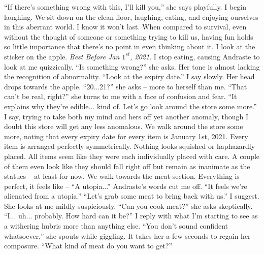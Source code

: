 \documentclass[a4paper, 12pt]{book}
\newcommand\tab[1][1cm]{\hspace*{#1}}
\begin{document}
\newline
\tab
``If there’s something wrong with this, I’ll kill you,'' she says playfully. I begin laughing. We sit down on the clean floor, laughing, eating, and enjoying ourselves in this aberrant world. I know it won’t last. When compared to survival, even without the thought of someone or something trying to kill us, having fun holds so little importance that there’s no point in even thinking about it.
\newline
\tab
I look at the sticker on the apple. \textit{Best Before Jan $1^{st}$, 2021}. I stop eating, causing Andraste to look at me quizzically. ``Is something wrong?'' she asks. Her tone is almost lacking the recognition of abnormality.
\newline
\tab
``Look at the expiry date.'' I say slowly.
\newline
\tab
Her head drops towards the apple. ``20...21?'' she asks -- more to herself than me. ``That can’t be real, right?'' she turns to me with a face of confusion and fear.
\newline
\tab
``It explains why they’re edible... kind of. Let’s go look around the store some more.'' I say, trying to take both my mind and hers off yet another anomaly, though I doubt this store will get any less anomalous. 
\newline
\tab
We walk around the store some more, noting that every expiry date for every item is January 1st, 2021. Every item is arranged perfectly symmetrically. Nothing looks squished or haphazardly placed. All items seem like they were each individually placed with care. A couple of them even look like they should fall right off but remain as inanimate as the statues -- at least for now. We walk towards the meat section. Everything is perfect, it feels like -- ``A utopia...'' Andraste’s words cut me off. ``It feels we’re alienated from a utopia.''
\newline
\tab
``Let’s grab some meat to bring back with us.'' I suggest.
\newline
\tab
She looks at me mildly suspiciously. ``Can you cook meat?'' she asks skeptically.
\newline
\tab
``I... uh... probably. How hard can it be?'' I reply with what I’m starting to see as a withering hubris more than anything else.
\newline
\tab
``You don’t sound confident whatsoever,'' she spouts while giggling. It takes her a few seconds to regain her composure. ``What kind of meat do you want to get?''
\newline
\end{document}

